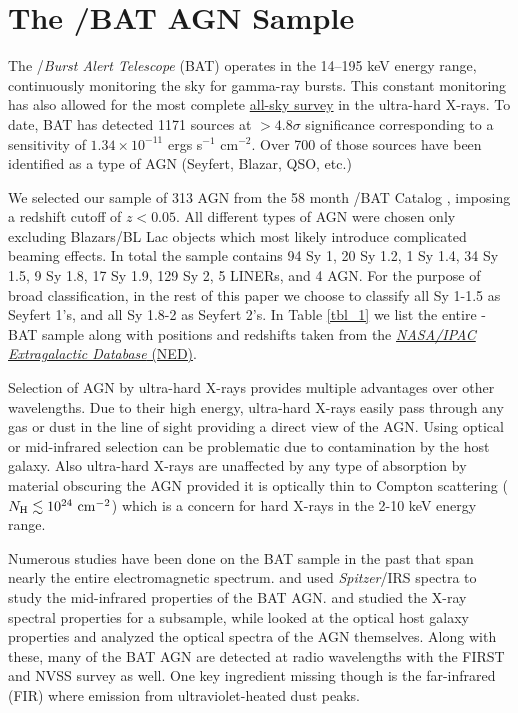 \section{The \swift/BAT AGN Sample}\label{sample}
The  \swift/\textit{Burst Alert Telescope} (BAT) \cite{Barthelmy_2005,Gehrels_2004} operates in the 14--195 keV energy range, continuously monitoring the sky for gamma-ray bursts. This constant monitoring has also allowed for the most complete \href{https://swift.gsfc.nasa.gov/results/bs70mon/}{all-sky survey} in the ultra-hard X-rays. To date, BAT has detected 1171 sources at  $>4.8\sigma$ significance corresponding to a sensitivity of $1.34\times10^{-11}$ ergs s$^{-1}$ cm$^{-2}$. Over 700 of those sources have been identified as a type of AGN (Seyfert, Blazar, QSO, etc.)

We selected our sample of 313 AGN from the 58 month \swift/BAT Catalog \citep{Baumgartner:2012gf}, imposing a redshift cutoff of $z<0.05$. All different types of AGN were chosen only excluding Blazars/BL Lac objects which most likely introduce complicated beaming effects. In total the sample contains 94 Sy 1, 20 Sy 1.2, 1 Sy 1.4, 34 Sy 1.5, 9 Sy 1.8, 17 Sy 1.9, 129 Sy 2, 5 LINERs, and 4 AGN. For the purpose of broad classification, in the rest of this paper we choose to classify all Sy 1-1.5 as Seyfert 1's, and all Sy 1.8-2 as Seyfert 2's. In Table \ref{tbl_1} we list the entire \herschel{}-BAT sample along with positions and redshifts taken from the \href{http://ned.ipac.caltech.edu/}{\textit{NASA/IPAC Extragalactic Database} (NED)}.

Selection of AGN by ultra-hard X-rays provides multiple advantages over other wavelengths. Due to their high energy, ultra-hard X-rays easily pass through any gas or dust in the line of sight providing a direct view of the AGN. Using optical or mid-infrared selection can be problematic due to contamination by the host galaxy. Also ultra-hard X-rays are unaffected by any type of absorption by material obscuring the AGN provided it is optically thin to Compton scattering ($N_{\rm{H}} \lesssim 10^{24}\,\, \rm{cm}^{-2}$) which is a concern for hard X-rays in the 2-10 keV energy range.

Numerous studies have been done on the BAT sample in the past that span nearly the entire electromagnetic spectrum. \citet{Weaver:2010rt} and \citet{Melendez:2008pd} used \textit{Spitzer}/IRS spectra to study the mid-infrared properties of the BAT AGN. \cite{Winter:2009kx} and \cite{Vasudevan:2013dz} studied the X-ray spectral properties for a subsample, while \citet{Koss:2011vn} looked at the optical host galaxy properties and \citep{Winter:2010yq} analyzed the optical spectra of the AGN themselves. Along with these, many of the BAT AGN are detected at radio wavelengths with the FIRST \citep{Becker:1995lq} and NVSS \citep{Condon:1998eu} survey as well. One key ingredient missing though is the far-infrared (FIR) where emission from ultraviolet-heated dust peaks.
  
  
